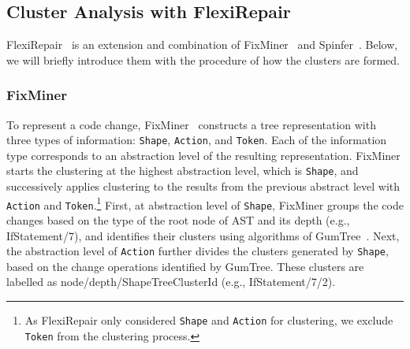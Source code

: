 \documentclass[conference]{IEEEtran}
\begin{document}








\subsection{Cluster Analysis with FlexiRepair}
\label{sec:RQ1_flexirepair}

FlexiRepair~\cite{koyuncu2020flexirepair} is an extension and combination of
FixMiner~\cite{koyuncu2020fixminer} and Spinfer~\cite{serrano2020spinfer}.
Below, we will briefly introduce them with the procedure of how the clusters are
formed.

\subsubsection{FixMiner}
To represent a code change, FixMiner~\cite{koyuncu2020fixminer} constructs a
tree representation with three types of information: \texttt{Shape},
\texttt{Action}, and \texttt{Token}. Each of the information type corresponds to
an abstraction level of the resulting representation. FixMiner starts the
clustering at the highest abstraction level, which is \texttt{Shape}, and
successively applies clustering to the results from the previous abstract level
with \texttt{Action} and \texttt{Token}.\footnote{As FlexiRepair only considered
\texttt{Shape} and \texttt{Action} for clustering, we exclude \texttt{Token}
from the clustering process.} First, at abstraction level of \texttt{Shape},
FixMiner groups the code changes based on the type of the root node of AST and
its depth (e.g., IfStatement/7), and identifies their clusters using
algorithms of GumTree~\cite{falleri2014fine}. Next, the abstraction level
of \texttt{Action} further divides the clusters generated by \texttt{Shape},
based on the change operations identified by GumTree. These clusters are
labelled as node/depth/ShapeTreeClusterId (e.g., IfStatement/7/2).
\end{document}
